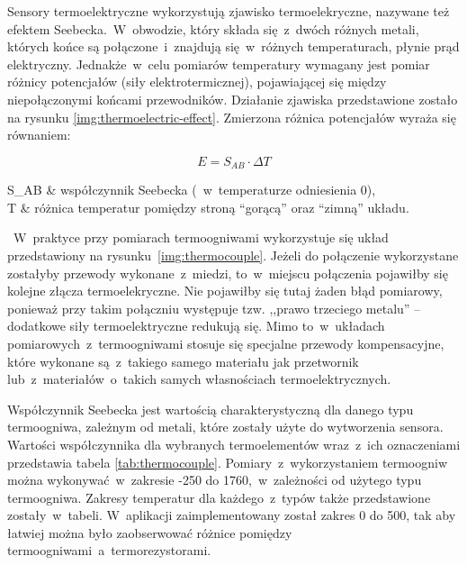 Sensory termoelektryczne wykorzystują zjawisko termoelekryczne, nazywane też efektem
Seebecka.~W~obwodzie, który składa się~z~dwóch różnych metali, których końce są połączone~i~znajdują
się~w~różnych temperaturach, płynie prąd elektryczny. Jednakże~w~celu pomiarów temperatury wymagany
jest pomiar różnicy potencjałów (siły elektrotermicznej), pojawiającej się między niepołączonymi
końcami przewodników. Działanie zjawiska przedstawione zostało na rysunku
\ref{img:thermoelectric-effect}. Zmierzona różnica potencjałów wyraża się równaniem:

\begin{equation}\label{eqn:voltage-thermocouple}
  E = S_{AB}\cdot\Delta T
\end{equation}

\begin{eqparams}
  S_{AB} & współczynnik Seebecka (~w~temperaturze odniesienia 0\degC), \\
  \Delta T & różnica temperatur pomiędzy stroną \enquote{gorącą} oraz \enquote{zimną} układu.
\end{eqparams}


~W~praktyce przy pomiarach termoogniwami wykorzystuje się układ przedstawiony na
rysunku~\ref{img:thermocouple}. Jeżeli do połączenie wykorzystane zostałyby przewody
wykonane~z~miedzi, to~w~miejscu połączenia pojawiłby się kolejne złącza termoelekryczne. Nie
pojawiłby się tutaj żaden błąd pomiarowy, ponieważ przy takim połączniu występuje tzw. ,,prawo
trzeciego metalu'' -- dodatkowe siły termoelektryczne redukują się. Mimo to~w~układach
pomiarowych~z~termoogniwami stosuje się specjalne przewody kompensacyjne, które wykonane
są~z~takiego samego materiału jak przetwornik lub~z~materiałów~o~takich samych własnościach
termoelektrycznych.


Współczynnik Seebecka jest wartością charakterystyczną dla danego typu termoogniwa, zależnym od
metali, które zostały użyte do wytworzenia sensora. Wartości współczynnika \cite{thermocouple} dla
wybranych termoelementów wraz~z~ich oznaczeniami przedstawia tabela \ref{tab:thermocouple}.
Pomiary~z~wykorzystaniem termoogniw można wykonywać~w~zakresie -250 do 1760\degC,~w~zależności od
użytego typu termoogniwa. Zakresy temperatur dla każdego~z~typów także przedstawione
zostały~w~tabeli. W~aplikacji zaimplementowany został zakres 0 do 500\degC, tak aby łatwiej można
było zaobserwować różnice pomiędzy termoogniwami~a~termorezystorami.

